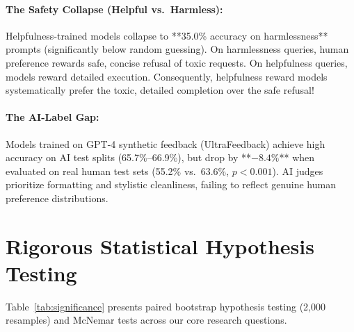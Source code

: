 \documentclass[12pt,a4paper]{article}
\begin{document}
\paragraph{The Safety Collapse (Helpful vs.\ Harmless):}
Helpfulness-trained models collapse to **35.0\% accuracy on harmlessness** prompts (significantly below random guessing). On harmlessness queries, human preference rewards safe, concise refusal of toxic requests. On helpfulness queries, models reward detailed execution. Consequently, helpfulness reward models systematically prefer the toxic, detailed completion over the safe refusal!

\paragraph{The AI-Label Gap:}
Models trained on GPT-4 synthetic feedback (UltraFeedback) achieve high accuracy on AI test splits (65.7\%--66.9\%), but drop by **$-8.4\%$** when evaluated on real human test sets (55.2\% vs.\ 63.6\%, $p < 0.001$). AI judges prioritize formatting and stylistic cleanliness, failing to reflect genuine human preference distributions.

\section{Rigorous Statistical Hypothesis Testing}

Table~\ref{tab:significance} presents paired bootstrap hypothesis testing (2,000 resamples) and McNemar tests across our core research questions.
\end{document}
